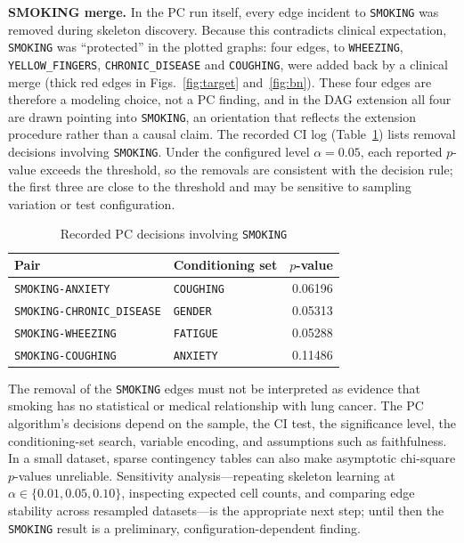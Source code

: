 \documentclass[10pt,twocolumn,letterpaper]{article}
\newcommand{\vn}[1]{{\small\texttt{#1}}}
\begin{document}
	\textbf{SMOKING merge.} In the PC run itself, every edge incident to \vn{SMOKING} was removed during skeleton discovery. Because this contradicts clinical expectation, \vn{SMOKING} was ``protected'' in the plotted graphs: four edges, to \vn{WHEEZING}, \vn{YELLOW\_FINGERS}, \vn{CHRONIC\_DISEASE} and \vn{COUGHING}, were added back by a clinical merge (thick red edges in Figs.~\ref{fig:target} and~\ref{fig:bn}). These four edges are therefore a modeling choice, not a PC finding, and in the DAG extension all four are drawn pointing into \vn{SMOKING}, an orientation that reflects the extension procedure rather than a causal claim. The recorded CI log (Table~\ref{tab:smoking}) lists removal decisions involving \vn{SMOKING}. Under the configured level \(\alpha = 0.05\), each reported \(p\)-value exceeds the threshold, so the removals are consistent with the decision rule; the first three are close to the threshold and may be sensitive to sampling variation or test configuration.

	\begin{table}[h]\centering
		\caption{Recorded PC decisions involving \vn{SMOKING}}\footnotesize
		\begin{tabular}{@{}llr@{}}
			\toprule
			Pair & Conditioning set & \(p\)-value\\
			\midrule
			\vn{SMOKING-ANXIETY} & \vn{COUGHING} & 0.06196\\
			\vn{SMOKING-CHRONIC\_DISEASE} & \vn{GENDER} & 0.05313\\
			\vn{SMOKING-WHEEZING} & \vn{FATIGUE} & 0.05288\\
			\vn{SMOKING-COUGHING} & \vn{ANXIETY} & 0.11486\\
			\bottomrule
		\end{tabular}
		\label{tab:smoking}
	\end{table}

	The removal of the \vn{SMOKING} edges must not be interpreted as evidence that smoking has no statistical or medical relationship with lung cancer. The PC algorithm's decisions depend on the sample, the CI test, the significance level, the conditioning-set search, variable encoding, and assumptions such as faithfulness. In a small dataset, sparse contingency tables can also make asymptotic chi-square \(p\)-values unreliable. Sensitivity analysis---repeating skeleton learning at \(\alpha \in \{0.01, 0.05, 0.10\}\), inspecting expected cell counts, and comparing edge stability across resampled datasets---is the appropriate next step; until then the \vn{SMOKING} result is a preliminary, configuration-dependent finding.
\end{document}
